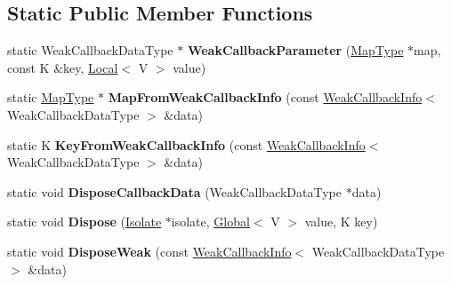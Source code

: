 \subsection*{Static Public Member Functions}
\begin{DoxyCompactItemize}
\item 
\hypertarget{classv8_1_1_default_global_map_traits_a3d4b483a077d6e5665cc62a23c719ee8}{}static Weak\+Callback\+Data\+Type $\ast$ {\bfseries Weak\+Callback\+Parameter} (\hyperlink{classv8_1_1_global_value_map}{Map\+Type} $\ast$map, const K \&key, \hyperlink{classv8_1_1_local}{Local}$<$ V $>$ value)\label{classv8_1_1_default_global_map_traits_a3d4b483a077d6e5665cc62a23c719ee8}

\item 
\hypertarget{classv8_1_1_default_global_map_traits_ae65c4d78f93d033712aa328654c00250}{}static \hyperlink{classv8_1_1_global_value_map}{Map\+Type} $\ast$ {\bfseries Map\+From\+Weak\+Callback\+Info} (const \hyperlink{classv8_1_1_weak_callback_info}{Weak\+Callback\+Info}$<$ Weak\+Callback\+Data\+Type $>$ \&data)\label{classv8_1_1_default_global_map_traits_ae65c4d78f93d033712aa328654c00250}

\item 
\hypertarget{classv8_1_1_default_global_map_traits_a2ebc8d3bbfbe32598863ab44caa36207}{}static K {\bfseries Key\+From\+Weak\+Callback\+Info} (const \hyperlink{classv8_1_1_weak_callback_info}{Weak\+Callback\+Info}$<$ Weak\+Callback\+Data\+Type $>$ \&data)\label{classv8_1_1_default_global_map_traits_a2ebc8d3bbfbe32598863ab44caa36207}

\item 
\hypertarget{classv8_1_1_default_global_map_traits_a106883e8168f48826fcfb71aa88e7994}{}static void {\bfseries Dispose\+Callback\+Data} (Weak\+Callback\+Data\+Type $\ast$data)\label{classv8_1_1_default_global_map_traits_a106883e8168f48826fcfb71aa88e7994}

\item 
\hypertarget{classv8_1_1_default_global_map_traits_af2a539ddbe5db2b6e1e944590e1dd7e6}{}static void {\bfseries Dispose} (\hyperlink{classv8_1_1_isolate}{Isolate} $\ast$isolate, \hyperlink{classv8_1_1_global}{Global}$<$ V $>$ value, K key)\label{classv8_1_1_default_global_map_traits_af2a539ddbe5db2b6e1e944590e1dd7e6}

\item 
\hypertarget{classv8_1_1_default_global_map_traits_ad3478535925c0f42664c97c4d35d1c91}{}static void {\bfseries Dispose\+Weak} (const \hyperlink{classv8_1_1_weak_callback_info}{Weak\+Callback\+Info}$<$ Weak\+Callback\+Data\+Type $>$ \&data)\label{classv8_1_1_default_global_map_traits_ad3478535925c0f42664c97c4d35d1c91}

\end{DoxyCompactItemize}

